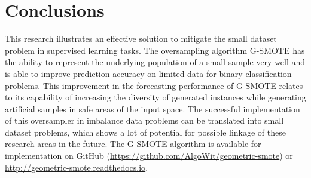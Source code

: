 \documentclass[parskip=full]{scrartcl}
\begin{document}
\section{Conclusions}

This research illustrates an effective solution to mitigate the small dataset 
problem in supervised learning tasks. The oversampling algorithm G-SMOTE has 
the ability to represent the underlying population of a small sample very well 
and is able to improve prediction accuracy on limited data for binary 
classification problems. This improvement in the forecasting performance of 
G-SMOTE relates to its capability of increasing the diversity of generated 
instances while generating artificial samples in safe areas of the input space. 
The successful implementation of this oversampler in imbalance data problems 
can be translated into small dataset problems, which shows a lot of potential 
for possible linkage of these research areas in the future. The G-SMOTE 
algorithm is available for implementation on GitHub 
(\url{https://github.com/AlgoWit/geometric-smote}) or 
\url{http://geometric-smote.readthedocs.io}.



\end{document}
